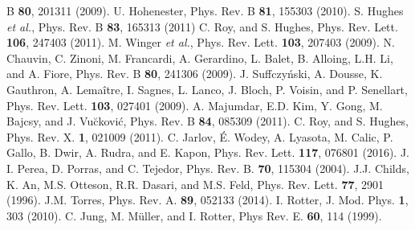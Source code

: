 \documentclass[aps,prl,showpacs,twocolumn]{revtex4}
\begin{document}
\begin{thebibliography}{99}
B {\bf 80}, 201311 (2009).
 U. Hohenester, Phys. Rev. B {\bf 81}, 155303 (2010).
S. Hughes {\it et al.}, Phys. Rev. B {\bf 83}, 165313 (2011)
 C. Roy, and S. Hughes, Phys. Rev. Lett. {\bf 106}, 247403 (2011).
M. Winger {\it et al.}, Phys. Rev. Lett. {\bf 103}, 207403 (2009).
 N. Chauvin, C. Zinoni, M. Francardi, A. Gerardino, L. Balet, B. Alloing, L.H. Li, and A. Fiore, Phys. Rev. B {\bf 80}, 241306 (2009).
 J. Suffczy\'nski, A. Dousse, K. Gauthron, A. Lema\^itre, I. Sagnes, L. Lanco, J. Bloch, P. Voisin, and P. Senellart, Phys. Rev. Lett. {\bf 103}, 027401 (2009).
 A. Majumdar, E.D. Kim, Y. Gong, M. Bajcsy, and J. Vu\u ckovi\'c, Phys. Rev. B {\bf 84}, 085309 (2011).
 C. Roy, and S. Hughes, Phys. Rev. X. {\bf 1}, 021009 (2011).
 C. Jarlov, \'E. Wodey, A. Lyasota, M. Calic, P. Gallo, B. Dwir, A. Rudra, and E. Kapon, Phys. Rev. Lett. {\bf 117}, 076801 (2016).
 J. I. Perea, D. Porras, and C. Tejedor, Phys. Rev. B. {\bf 70}, 115304 (2004).
 J.J. Childs, K. An, M.S. Otteson, R.R. Dasari, and M.S. Feld, Phys. Rev. Lett. {\bf 77}, 2901 (1996).
 J.M. Torres, Phys. Rev. A. {\bf 89}, 052133 (2014).
 I. Rotter, J. Mod. Phys. {\bf 1}, 303 (2010).
 C. Jung, M. M\"uller, and I. Rotter, Phys Rev. E. {\bf 60}, 114 (1999).
%
%
%
%
%
%
\end{thebibliography}
\end{document}
